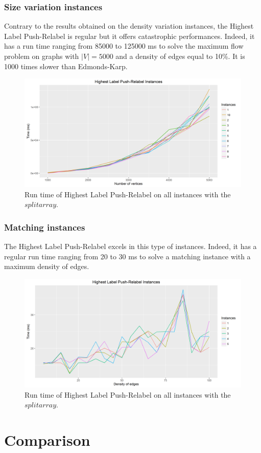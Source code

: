\subsubsection{Size variation instances}
Contrary to the results obtained on the density variation instances, the Highest Label Push-Relabel is regular but it offers catastrophic performances. Indeed, it has a run time ranging from 85000 to 125000 ms to solve the maximum flow problem on graphs with $|V|=5000$ and a density of edges equal to 10\%. It is 1000 times slower than Edmonds-Karp.
\begin{figure}[H]
\begin{center}
\includegraphics[scale=0.5]{images/HLPRmean.png}
\caption{Run time of Highest Label Push-Relabel on all instances with the $split array$.}
\label{fig:HLPRmean}
\end{center}
\end{figure}
\subsubsection{Matching instances}
The Highest Label Push-Relabel excels in this type of instances. Indeed, it has a regular run time ranging from 20 to 30 ms to solve a matching instance with a maximum density of edges.
\begin{figure}[H]
\begin{center}
\includegraphics[scale=0.5]{images/prmatching.png}
\caption{Run time of Highest Label Push-Relabel on all instances with the $split array$.}
\label{fig:prmatching}
\end{center}
\end{figure}
\section{Comparison}
